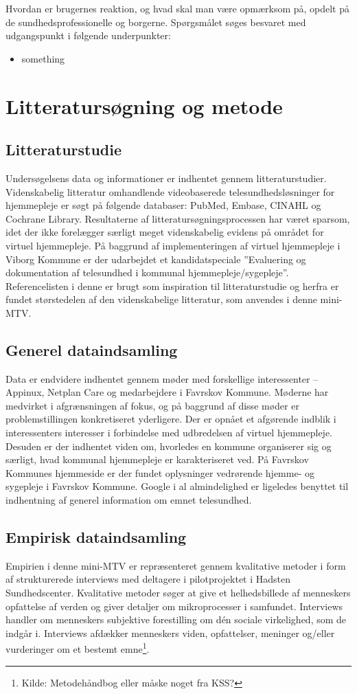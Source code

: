 Hvordan er brugernes reaktion, og hvad skal man være opmærksom på, opdelt på de sundhedsprofessionelle og borgerne.
Spørgsmålet søges besvaret med udgangspunkt i følgende underpunkter:
\begin{itemize}
	\item something
\end{itemize}	

\section{Litteratursøgning og metode}
\subsection{Litteraturstudie}
Undersøgelsens data og informationer er indhentet gennem litteraturstudier. Videnskabelig litteratur omhandlende videobaserede telesundhedsløsninger for hjemmepleje er søgt på følgende databaser: PubMed, Embase, CINAHL og Cochrane Library. Resultaterne af litteratursøgningsprocessen har været sparsom, idet der ikke forelægger særligt meget videnskabelig evidens på området for virtuel hjemmepleje. På baggrund af implementeringen af virtuel hjemmepleje i Viborg Kommune er der udarbejdet et kandidatspeciale ”Evaluering og dokumentation af telesundhed i kommunal hjemmepleje/sygepleje”. Referencelisten i denne er brugt som inspiration til litteraturstudie og herfra er fundet størstedelen af den videnskabelige litteratur, som anvendes i denne mini-MTV.

\subsection{Generel dataindsamling}
Data er endvidere indhentet gennem møder med forskellige interessenter – Appinux, Netplan Care og medarbejdere i Favrskov Kommune. Møderne har medvirket i afgrænsningen af fokus, og på baggrund af disse møder er problemstillingen konkretiseret yderligere. Der er opnået et afgørende indblik i interessenters interesser i forbindelse med udbredelsen af virtuel hjemmepleje. Desuden er der indhentet viden om, hvorledes en kommune organiserer sig og særligt, hvad kommunal hjemmepleje er karakteriseret ved. På Favrskov Kommunes hjemmeside er der fundet oplysninger vedrørende hjemme- og sygepleje i Favrskov Kommune. Google i al almindelighed er ligeledes benyttet til indhentning af generel information om emnet telesundhed.
 
\subsection{Empirisk dataindsamling }
Empirien i denne mini-MTV er repræsenteret gennem kvalitative metoder i form af strukturerede interviews med deltagere i pilotprojektet i Hadsten Sundhedscenter. Kvalitative metoder søger at give et helhedsbillede af menneskers opfattelse af verden og giver detaljer om mikroprocesser i samfundet. Interviews handler om menneskers subjektive forestilling om dén sociale virkelighed, som de indgår i. Interviews afdækker menneskers viden, opfattelser, meninger og/eller vurderinger om et bestemt emne\footnote{Kilde: Metodehåndbog eller måske noget fra KSS?}. 

